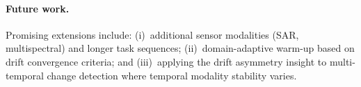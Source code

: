 \paragraph{Future work.}
Promising extensions include: (i)~additional sensor modalities (SAR, multispectral) and longer task sequences; (ii)~domain-adaptive warm-up based on drift convergence criteria; and (iii)~applying the drift asymmetry insight to multi-temporal change detection where temporal modality stability varies.
